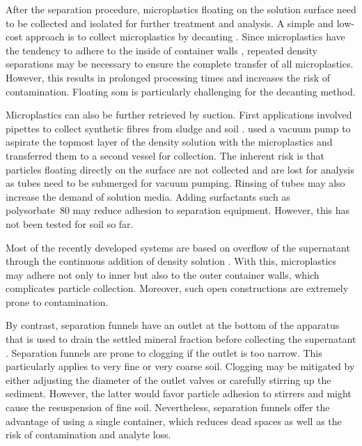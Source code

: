 After the separation procedure, microplastics floating on the solution surface need to be collected and isolated for further treatment and analysis. A simple and low-cost approach is to collect microplastics by decanting \citep{BesleyStandardized2017,HuangAgricultural2020,ZhangSimple2018,ScheurerMicroplastics2018}. Since microplastics have the tendency to adhere to the inside of container walls \citep{NakajimaSmall2019}, repeated density separations may be necessary to ensure the complete transfer of all microplastics. However, this results in prolonged processing times and increases the risk of contamination. Floating \ac{som} is particularly challenging for the decanting method.

Microplastics can also be further retrieved by suction. First applications involved pipettes to collect synthetic fibres from sludge and soil \citep{ZubrisSynthetic2005,Prendergast-MillerPolyesterderived2019}.  used a vacuum pump to aspirate the topmost layer of the density solution with the microplastics and transferred them to a second vessel for collection.
The inherent risk is that particles floating directly on the surface are not collected and are lost for analysis as tubes need to be submerged for vacuum pumping. Rinsing of tubes may also increase the demand of solution media. Adding surfactants such as polysorbate~80
\citep{EndersWhen2020} may reduce adhesion to separation equipment.
However, this has not been tested for soil so far.

Most of the recently developed systems are based on overflow of the supernatant through the continuous addition of density solution \citep{NuelleNew2014,ZhouMicroplastics2020,VermeirenMicroplastic2020,WangPoor2018,LiuMicroplastic2018,LiuMethod2019,HanOptimized2019}. With this, microplastics may adhere not only to inner but also to the outer container walls, which complicates particle collection. Moreover, such open constructions are extremely prone to contamination.

By contrast, separation funnels have an outlet at the bottom of the apparatus that is used to drain the settled mineral fraction before collecting the supernatant \citep{WangPoor2018,NuelleNew2014,MahonMicroplastics2017}. Separation funnels are prone to clogging if the outlet is too narrow. This particularly applies to very fine or very coarse soil. Clogging may be mitigated by either adjusting the diameter of the outlet valves \citep{EndersWhen2020} or carefully stirring up the sediment. However, the latter would favor particle adhesion to stirrers and might cause the resuspension of fine soil. Nevertheless, separation funnels offer the advantage of using a single container, which reduces dead spaces as well as the risk of contamination and analyte loss.

